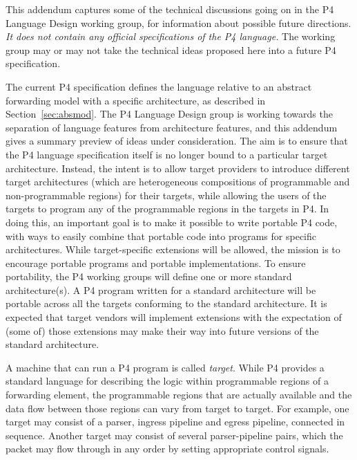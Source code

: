%


This addendum captures some of the technical discussions going on
in the P4 Language Design working group, for information about possible future
directions. \textit{It does not contain any
official specifications of the P4 language.} The working group may or may not
take the technical ideas proposed here into a future P4 specification.


The current P4 specification defines the language relative to an
abstract forwarding model with a specific architecture, as described
in Section~\ref{sec:absmod}.  The P4 Language Design group is working
towards the separation of language features from architecture features,
and this addendum gives a summary preview of ideas under consideration.
The aim is to ensure that the P4 language specification itself is no longer
bound to a particular target architecture.  Instead, the intent is to
allow target providers to introduce different target architectures
(which are heterogeneous compositions of programmable and non-programmable
regions) for their targets, while allowing the users of the targets to program
any of the programmable regions in the targets in P4.  In doing this, an
important goal is to make it possible to write portable P4 code, with ways to
easily combine that portable code into programs for specific architectures.
While target-specific extensions will be allowed, the mission is to encourage
portable programs and portable implementations.  To ensure portability,
the P4 working groups will define one or more standard architecture(s).
A P4 program written for a standard architecture will be portable across all
the targets conforming to the standard architecture.  It is expected that target
vendors will implement extensions with the expectation of (some of) those
extensions may make their way into future versions of the standard architecture.


A machine that can run a P4 program is called \textit{target}.
While P4 provides a standard language for describing the logic within
programmable regions of a forwarding element, the programmable regions that are
actually available and the data flow between those regions can vary
from target to target.  For example, one target may consist of a parser,
ingress \matchaction pipeline and egress \matchaction pipeline, connected in
sequence.  Another target may consist of several parser-pipeline pairs,
which the packet may flow through in any order by setting appropriate
control signals.

